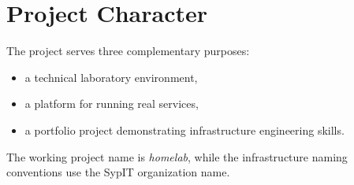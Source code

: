 \section{Project Character}

The project serves three complementary purposes:

\begin{itemize}
    \item a technical laboratory environment,
    \item a platform for running real services,
    \item a portfolio project demonstrating infrastructure engineering skills.
\end{itemize}

The working project name is \textit{homelab}, while the infrastructure
naming conventions use the SypIT organization name.